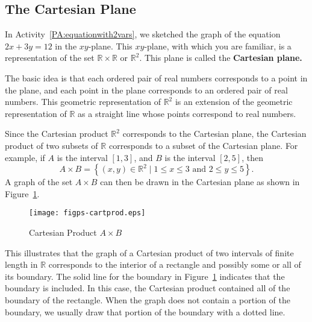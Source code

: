 \subsection*{The Cartesian Plane}
In \typeu Activity~\ref*{PA:equationwith2vars}, we sketched the graph of the equation  $2x + 3y = 12$ in the $xy$-plane.  This $xy$-plane, with which you are familiar, is a representation of the set  $\mathbb{R} \times \mathbb{R}$ \label{sym:cartplane} or  $\mathbb{R}^2 $.  This plane is called the \textbf{Cartesian plane.}
% 

The basic idea is that each ordered pair of real numbers corresponds to a point in the plane, and each point in the plane corresponds to an ordered pair of real numbers.  This geometric representation of  $\mathbb{R}^2 $ is an extension of the geometric representation of  $\mathbb{R}$ as a straight line whose points correspond to real numbers.

Since the Cartesian product  $\mathbb{R}^2 $ corresponds to the Cartesian plane, the Cartesian product of two subsets of  $\mathbb{R}$  corresponds to a subset of the Cartesian plane.  For example, if  $A$  is the interval  $\left[ {1,3} \right]$, and  $B$  is the interval  $\left[ {2,5} \right]$, then
\[
A \times B = \left\{ {\left( {x, y} \right) \in \mathbb{R}^2 \mid 1 \leq x \leq 3\text{ and }2 \leq y \leq 5} \right\}\!.
\]
A graph of the set  $A \times B$ can then be drawn in the Cartesian plane as shown in Figure~\ref{fig:cartprod}.
%
\begin{figure}[h]
\begin{center}
\texttt{[image: figps-cartprod.eps]}
\caption{Cartesian Product $A \times B$} \label{fig:cartprod}
\end{center}
\end{figure}

This illustrates that the graph of a Cartesian product of two intervals of finite length in  $\mathbb{R}$ corresponds to the interior of a rectangle and possibly some or all of its boundary.  The solid line for the boundary in Figure~\ref{fig:cartprod} indicates that the boundary is included.  In this case, the Cartesian product contained all of the boundary of the rectangle.  When the graph does not contain a portion of the boundary, we usually draw that portion of the boundary with a dotted line.




